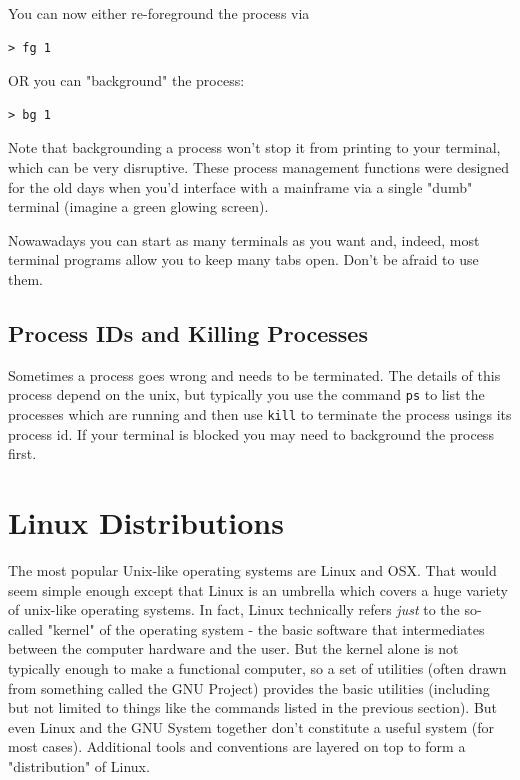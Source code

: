 \documentclass[11pt]{article}
\begin{document}
You can now either re-foreground the process via

\begin{verbatim}
> fg 1
\end{verbatim}

OR you can "background" the process:

\begin{verbatim}
> bg 1
\end{verbatim}

Note that backgrounding a process won't stop it from printing to
your terminal, which can be very disruptive.  These process
management functions were designed for the old days when you'd
interface with a mainframe via a single "dumb" terminal (imagine a
green glowing screen).

Nowawadays you can start as many terminals as you want and, indeed,
most terminal programs allow you to keep many tabs open. Don't be
afraid to use them.

\subsection{Process IDs and Killing Processes}
\label{sec:orgc0de635}

Sometimes a process goes wrong and needs to be terminated. The
details of this process depend on the unix, but typically you use
the command \texttt{ps} to list the processes which are running and then
use \texttt{kill} to terminate the process usings its process id. If your
terminal is blocked you may need to background the process
first.

\section{Linux Distributions}
\label{sec:org035aa81}

The most popular Unix-like operating systems are Linux and OSX. That
would seem simple enough except that Linux is an umbrella which covers
a huge variety of unix-like operating systems.  In fact, Linux
technically refers \emph{just} to the so-called "kernel" of the operating
system - the basic software that intermediates between the computer
hardware and the user. But the kernel alone is not typically enough to
make a functional computer, so a set of utilities (often drawn from
something called the GNU Project) provides the basic utilities
(including but not limited to things like the commands listed in the
previous section). But even Linux and the GNU System together don't
constitute a useful system (for most cases). Additional tools and
conventions are layered on top to form a "distribution" of Linux.
\end{document}
